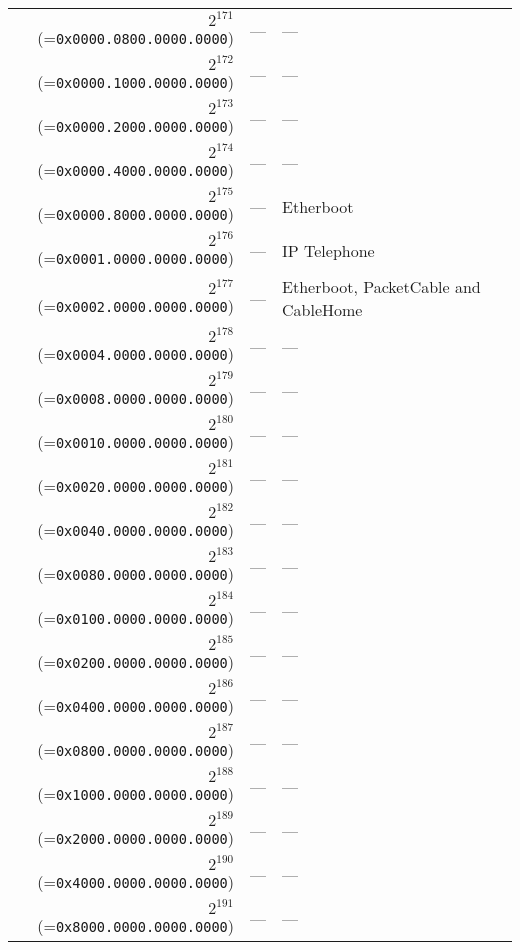 \documentclass[documentation]{subfiles}
\begin{document}
\begin{small}
\begin{longtable}{rcl}
        $2^{171}$ (={\tt 0x0000.0800.0000.0000}) & ---   & --- \\
        $2^{172}$ (={\tt 0x0000.1000.0000.0000}) & ---   & --- \\
        $2^{173}$ (={\tt 0x0000.2000.0000.0000}) & ---   & --- \\
        $2^{174}$ (={\tt 0x0000.4000.0000.0000}) & ---   & --- \\
        $2^{175}$ (={\tt 0x0000.8000.0000.0000}) & ---   & Etherboot \\
        $2^{176}$ (={\tt 0x0001.0000.0000.0000}) & ---   & IP Telephone \\
        $2^{177}$ (={\tt 0x0002.0000.0000.0000}) & ---   & Etherboot, PacketCable and CableHome \\
        $2^{178}$ (={\tt 0x0004.0000.0000.0000}) & ---   & --- \\
        $2^{179}$ (={\tt 0x0008.0000.0000.0000}) & ---   & --- \\
        $2^{180}$ (={\tt 0x0010.0000.0000.0000}) & ---   & --- \\
        $2^{181}$ (={\tt 0x0020.0000.0000.0000}) & ---   & --- \\
        $2^{182}$ (={\tt 0x0040.0000.0000.0000}) & ---   & --- \\
        $2^{183}$ (={\tt 0x0080.0000.0000.0000}) & ---   & --- \\
        $2^{184}$ (={\tt 0x0100.0000.0000.0000}) & ---   & --- \\
        $2^{185}$ (={\tt 0x0200.0000.0000.0000}) & ---   & --- \\
        $2^{186}$ (={\tt 0x0400.0000.0000.0000}) & ---   & --- \\
        $2^{187}$ (={\tt 0x0800.0000.0000.0000}) & ---   & --- \\
        $2^{188}$ (={\tt 0x1000.0000.0000.0000}) & ---   & --- \\
        $2^{189}$ (={\tt 0x2000.0000.0000.0000}) & ---   & --- \\
        $2^{190}$ (={\tt 0x4000.0000.0000.0000}) & ---   & --- \\
        $2^{191}$ (={\tt 0x8000.0000.0000.0000}) & ---   & --- \\
        \bottomrule
    \end{longtable}
\end{small}
\end{document}
